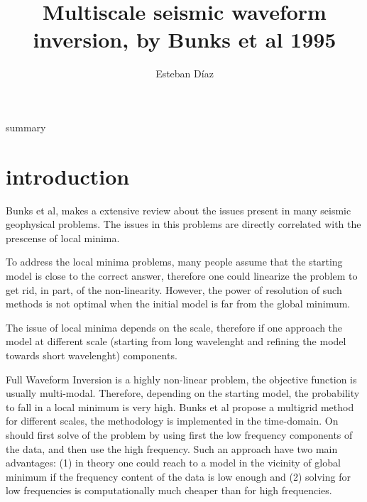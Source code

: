 

\author{Esteban D\'{i}az}
\title{Multiscale seismic waveform inversion, by Bunks et al 1995}{summary}



\section{introduction}

Bunks et al, makes a extensive review about the issues present in many seismic 
geophysical problems. The issues in this problems are directly correlated with the prescense
of local minima. 

To address the local minima problems, many people assume that the starting model 
is close to the correct answer, therefore one could linearize the problem to get rid,
in part, of the non-linearity. However, the power of resolution of such methods is not
optimal when the initial model is far from the global minimum.

The issue of local minima depends on the scale, therefore if one approach the model 
at different scale (starting from long wavelenght and refining the model towards short
wavelenght) components. 

Full Waveform Inversion is a highly non-linear problem, the objective function is usually
multi-modal. Therefore, depending on the starting model, the probability to fall
in a local minimum is very high. Bunks et al propose a multigrid method for different scales,
the methodology is implemented in the time-domain. On should first solve of the problem
by using first the low frequency components of the data, and then use the high frequency.
Such an approach have two main advantages: (1) in theory one could reach to a model
in the vicinity of global minimum if the frequency content of the data is low enough and (2)
solving for low frequencies is computationally much cheaper than for high frequencies.


